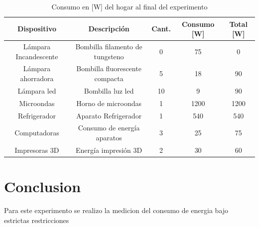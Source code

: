 \documentclass[]{article}
\begin{document}
\begin{table}[h!]
\centering

\begin{tabular}{|c|c|c|c|c|}
\hline
Dispositivo           & Descripción                     & Cant. & Consumo {[}W{]} & Total [W] \\ \hline
Lámpara Incandescente & Bombilla filamento de tungsteno & 0                  & 75              & 0           \\ \hline
Lámpara ahorradora    & Bombilla fluorescente compacta  & 5                 & 18              & 90           \\ \hline
Lámpara led           & Bombilla luz led                & 10                  & 9               & 90            \\ \hline
Microondas            & Horno de microondas             & 1                  & 1200            & 1200          \\ \hline
Refrigerador          & Aparato Refrigerador            & 1                  & 540             & 540           \\ \hline
Computadoras          & Consumo de energía aparatos     & 3                  & 25              & 75            \\ \hline
Impresoras 3D         & Energía impresión 3D            & 2                  & 30              & 60            \\ \hline
\end{tabular}
\caption{Consumo en [W] del hogar al final del experimento}
\label{tablaConsumoSegundo}
\end{table}


\section{Conclusion}

Para este experimento se realizo la medicion del consumo de energia bajo estrictas restricciones



%
\end{document}
